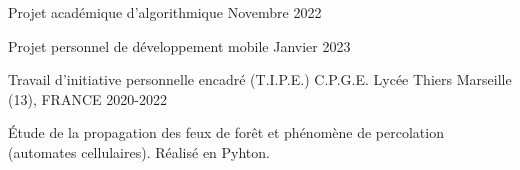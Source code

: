 \begin{cventries}
{\begin{cvitems}
        \item{}
      \end{cvitems}
    }
  \cventry
    {Projet académique d'algorithmique} %
    {} %
    {} %
    {Novembre 2022} %
    {
      \begin{cvitems} %
        \item{}
      \end{cvitems}
    }
  \cventry
    {Projet personnel de développement mobile} %
    {} %
    {} %
    {Janvier 2023} %
    {
      \begin{cvitems} %
        \item{}
      \end{cvitems}
    }
  \cventry
    {Travail d'initiative personnelle encadré (T.I.P.E.)} %
    {C.P.G.E. Lycée Thiers} %
    {Marseille (13), FRANCE} %
    {2020-2022} %
    {
      \begin{cvitems} %
        \item{Étude de la propagation des feux de forêt et phénomène de percolation (automates cellulaires). Réalisé en Pyhton.}
      \end{cvitems}
    }


\end{cventries}
